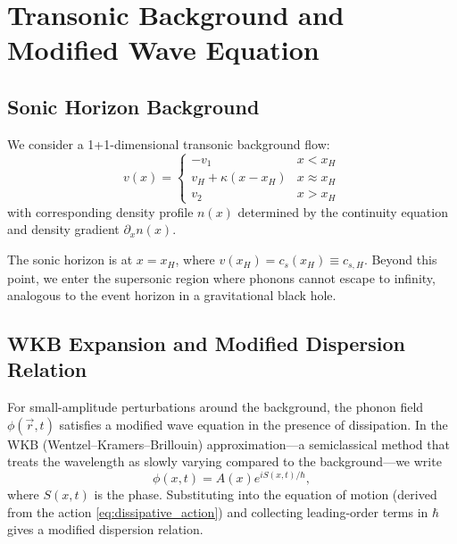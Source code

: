 \documentclass[aps,prl,twocolumn,superscriptaddress,nofootinbib,amsmath,amssymb]{revtex4-2}
\begin{document}
\section{Transonic Background and Modified Wave Equation}
\label{sec:background}

\subsection{Sonic Horizon Background}

We consider a 1+1-dimensional transonic background flow:
\begin{equation}
\label{eq:background_flow}
v(x) = \begin{cases}
-v_1 & x < x_H \\
v_H + \kappa(x - x_H) & x \approx x_H \\
v_2 & x > x_H
\end{cases}
\end{equation}
with corresponding density profile $n(x)$ determined by the continuity equation and density gradient $\partial_x n(x)$.

The sonic horizon is at $x = x_H$, where $v(x_H) = c_s(x_H) \equiv c_{s,H}$. Beyond this point, we enter the supersonic region where phonons cannot escape to infinity, analogous to the event horizon in a gravitational black hole.

\subsection{WKB Expansion and Modified Dispersion Relation}

For small-amplitude perturbations around the background, the phonon field $\phi(\vec{r}, t)$ satisfies a modified wave equation in the presence of dissipation. In the WKB (Wentzel--Kramers--Brillouin) approximation---a semiclassical method that treats the wavelength as slowly varying compared to the background---we write
\begin{equation}
\label{eq:wkb_ansatz}
\phi(x, t) = A(x) e^{iS(x,t)/\hbar},
\end{equation}
where $S(x,t)$ is the phase. Substituting into the equation of motion (derived from the action \eqref{eq:dissipative_action}) and collecting leading-order terms in $\hbar$ gives a modified dispersion relation.
\end{document}

